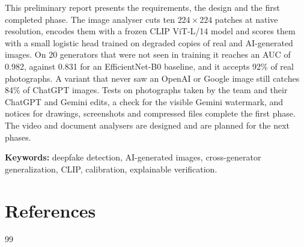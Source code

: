 \documentclass[12pt,a4paper]{report}
\begin{document}
This preliminary report presents the requirements, the design and the first completed phase. The image analyser cuts ten $224\times224$ patches at native resolution, encodes them with a frozen CLIP ViT-L/14 model and scores them with a small logistic head trained on degraded copies of real and AI-generated images. On 20 generators that were not seen in training it reaches an AUC of 0.982, against 0.831 for an EfficientNet-B0 baseline, and it accepts 92\% of real photographs. A variant that never saw an OpenAI or Google image still catches 84\% of ChatGPT images. Tests on photographs taken by the team and their ChatGPT and Gemini edits, a check for the visible Gemini watermark, and notices for drawings, screenshots and compressed files complete the first phase. The video and document analysers are designed and are planned for the next phases.

\medskip
\noindent\textbf{Keywords:} deepfake detection, AI-generated images, cross-generator generalization, CLIP, calibration, explainable verification.
\newpage

\singlespacing
\tableofcontents
\newpage
\listoffigures
\newpage
\listoftables
\newpage

\onehalfspacing








\chapter*{References}
\begingroup
\small
\singlespacing
\renewcommand{\chapter}[2]{}   %
\begin{thebibliography}{99}

\end{thebibliography}
\endgroup

\appendix

\end{document}
